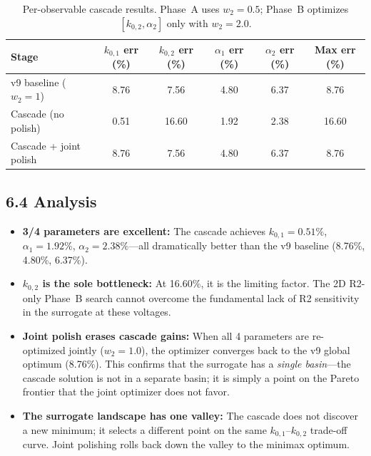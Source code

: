 \documentclass[11pt]{article}
\begin{document}
\begin{table}[H]
  \centering
  \caption{Per-observable cascade results.  Phase~A uses $w_2 = 0.5$;
           Phase~B optimizes $[k_{0,2}, \alpha_2]$ only with $w_2 = 2.0$.}
  \label{tab:cascade}
  \begin{tabular}{l S[round-precision=2] S[round-precision=2]
                    S[round-precision=2] S[round-precision=2]
                    S[round-precision=2]}
    \toprule
    Stage & {$k_{0,1}$ err (\%)} & {$k_{0,2}$ err (\%)}
          & {$\alpha_1$ err (\%)} & {$\alpha_2$ err (\%)}
          & {Max err (\%)} \\
    \midrule
    v9 baseline ($w_2 = 1$) &  8.76 &  7.56 & 4.80 & 6.37 &  8.76 \\
    Cascade (no polish)     &  0.51 & 16.60 & 1.92 & 2.38 & 16.60 \\
    Cascade + joint polish  &  8.76 &  7.56 & 4.80 & 6.37 &  8.76 \\
    \bottomrule
  \end{tabular}
\end{table}

\subsection*{6.4 Analysis}

\begin{itemize}
  \item \textbf{3/4 parameters are excellent:} The cascade achieves
        $k_{0,1} = 0.51\%$, $\alpha_1 = 1.92\%$, $\alpha_2 = 2.38\%$---all
        dramatically better than the v9 baseline (8.76\%, 4.80\%, 6.37\%).

  \item \textbf{$k_{0,2}$ is the sole bottleneck:} At 16.60\%, it is the
        limiting factor.  The 2D R2-only Phase~B search cannot overcome the
        fundamental lack of R2 sensitivity in the surrogate at these voltages.

  \item \textbf{Joint polish erases cascade gains:} When all 4 parameters are
        re-optimized jointly ($w_2 = 1.0$), the optimizer converges back to the
        v9 global optimum (8.76\%).  This confirms that the surrogate has a
        \emph{single basin}---the cascade solution is not in a separate
        basin; it is simply a point on the Pareto frontier that the joint
        optimizer does not favor.

  \item \textbf{The surrogate landscape has one valley:} The cascade does not
        discover a new minimum; it selects a different point on the same
        $k_{0,1}$--$k_{0,2}$ trade-off curve.  Joint polishing rolls back
        down the valley to the minimax optimum.
\end{itemize}
\end{document}
